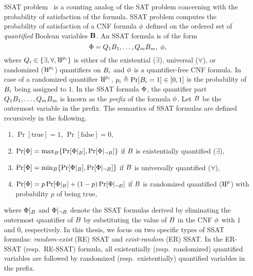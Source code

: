SSAT problem~\cite{littman2001stochastic} is a counting analog of the SAT problem concerning with the probability of satisfaction of the formula. SSAT problem computes the  probability of satisfaction of a CNF formula $\phi$ defined on the ordered set of \textit{quantified} Boolean variables $ \mathbf{B} $. 
An SSAT formula is of the form
\begin{equation}\label{fairness_justicia_eq:ssat}
	\Phi = Q_1B_1, \dots, Q_m B_m,\; \phi, 
\end{equation}
where $ \varquantifier_i \in \{\exists, \forall, \R^{p_i}\} $ is either of the existential ($\exists$), universal ($\forall$), or randomized ($\R^{p_i}$) quantifiers on $B_i$ and $\phi$ is a quantifier-free CNF formula. In case of a randomized quantifier $ \R^{p_i} $, $ p_i \triangleq \Pr[B_i = 1] \in [0,1] $ is the probability of $ B_i $ being assigned to $ 1 $. In the SSAT formula $ \Phi $, the quantifier part $ Q_1B_1, \dots, Q_m B_m $ is known as the \textit{prefix} of the formula $ \phi $.  Let $ B $ be the outermost variable in the prefix. The semantics of SSAT formulas are defined recursively in the following.

\begin{enumerate}
	\item $ \Pr[\text{true}] = 1 $,  $ \Pr[\text{false}] = 0 $, 
	\item $ \Pr [\Phi] = \max_{B} \{\Pr[\Phi|_{B}], \Pr[\Phi|_{\neg B}]\}$ if $ B $ is existentially quantified ($ \exists $), 
	\item $ \Pr [\Phi] = \min_{B} \{\Pr[\Phi|_{B}], \Pr[\Phi|_{\neg B}]\} $ if $ B $ is universally quantified ($ \forall $), 
	\item $ \Pr [\Phi] = p\Pr[\Phi|_{B}] + (1-p) \Pr[\Phi|_{\neg B}] $ if $ B $ is randomized quantified ($\R^{p}$) with probability $p$ of being $\text{true}$,
\end{enumerate}

where $ \Phi|_{B} $ and $ \Phi|_{\neg B} $ denote the SSAT formulas derived by eliminating the outermost quantifier of $ B $  by substituting the value of $ B $ in the CNF $ \phi $ with $ 1 $ and $ 0 $, respectively. In this thesis, we focus on two specific types of SSAT formulas:  \textit{random-exist} (RE) SSAT and \textit{exist-random} (ER) SSAT. In the ER-SSAT (resp.\ RE-SSAT) formula, all existentially (resp.\ randomized) quantified variables are followed by randomized (resp.\ existentially) quantified variables in the prefix.


